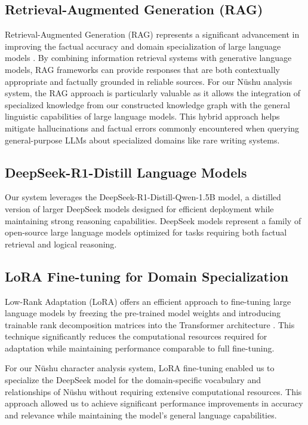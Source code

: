 \documentclass{article}
\begin{document}
\subsection{Retrieval-Augmented Generation (RAG)}
\label{ssec:rag_intro}
    Retrieval-Augmented Generation (RAG) represents a significant advancement in improving the factual accuracy and domain specialization of large language models \cite{gaoRetrievalAugmentedGenerationLarge2024}. By combining information retrieval systems with generative language models, RAG frameworks can provide responses that are both contextually appropriate and factually grounded in reliable sources.
    For our N\"{u}shu analysis system, the RAG approach is particularly valuable as it allows the integration of specialized knowledge from our constructed knowledge graph with the general linguistic capabilities of large language models. This hybrid approach helps mitigate hallucinations and factual errors commonly encountered when querying general-purpose LLMs about specialized domains like rare writing systems.

\subsection{DeepSeek-R1-Distill Language Models}
\label{ssec:deepseek_intro}
    Our system leverages the DeepSeek-R1-Distill-Qwen-1.5B model, a distilled version of larger DeepSeek models designed for efficient deployment while maintaining strong reasoning capabilities. DeepSeek models represent a family of open-source large language models optimized for tasks requiring both factual retrieval and logical reasoning\cite{deepseek-aiDeepSeekR1IncentivizingReasoning2025}.

\subsection{LoRA Fine-tuning for Domain Specialization}
\label{ssec:lora_intro}
    Low-Rank Adaptation (LoRA) offers an efficient approach to fine-tuning large language models by freezing the pre-trained model weights and introducing trainable rank decomposition matrices into the Transformer architecture \cite{huLoRALowRankAdaptation2021}. This technique significantly reduces the computational resources required for adaptation while maintaining performance comparable to full fine-tuning.
    
    For our N\"{u}shu character analysis system, LoRA fine-tuning enabled us to specialize the DeepSeek model for the domain-specific vocabulary and relationships of N\"{u}shu without requiring extensive computational resources. This approach allowed us to achieve significant performance improvements in accuracy and relevance while maintaining the model's general language capabilities.
\end{document}
